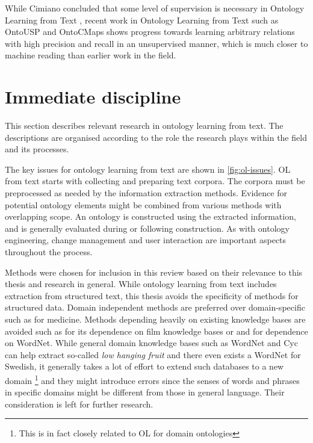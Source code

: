 \documentclass[a4paper]{report}
\begin{document}
While Cimiano concluded that some level of supervision is necessary in Ontology Learning from Text \citep{Cimiano06}, recent work in Ontology Learning from Text such as OntoUSP\citep{Poon2010OntoUSP} and OntoCMaps \citep{Zouaq11OntoCmaps} shows progress towards learning arbitrary relations with high precision and recall in an unsupervised manner, which is much closer to machine reading than earlier work in the field.


\section{Immediate discipline}
\label{sec:lit-rev:immediate}

This section describes relevant research in ontology learning from text.
The descriptions are organised according to the role the research plays within the field and its processes.

The key issues for ontology learning from text are shown in \ref{fig:ol-issues}.
OL from text starts with collecting and preparing text corpora.
The corpora must be preprocessed as needed by the information extraction methods.
Evidence for potential ontology elements might be combined from various methods with overlapping scope.
An ontology is constructed using the extracted information, and is generally evaluated during or following construction.
As with ontology engineering, change management and user interaction are important aspects throughout the process.

Methods were chosen for inclusion in this review based on their relevance to this thesis and research in general.
While ontology learning from text includes extraction from structured text, this thesis avoids the specificity of methods for structured data.
Domain independent methods are preferred over domain-specific such as \cite{LeeEtAl03OLMed} for medicine.
Methods depending heavily on existing knowledge bases are avoided such as \cite{Gulla08LOUIE} for its dependence on film knowledge bases or \cite{Drumond10PREHE} and \cite{HaiTaoEtAl08Clonto} for dependence on WordNet\cite{Fellbaum98WordNet}.
While general domain knowledge bases such as WordNet and Cyc\cite{Lenat95Cyc} can help extract so-called \emph{low hanging fruit} and there even exists a WordNet for Swedish\cite{Viberg02SWordNet}, it generally takes a lot of effort to extend such databases to a new domain \footnote{This is in fact closely related to OL for domain ontologies} and they might introduce errors since the senses of words and phrases in specific domains might be different from those in general language.
Their consideration is left for further research.
\end{document}
